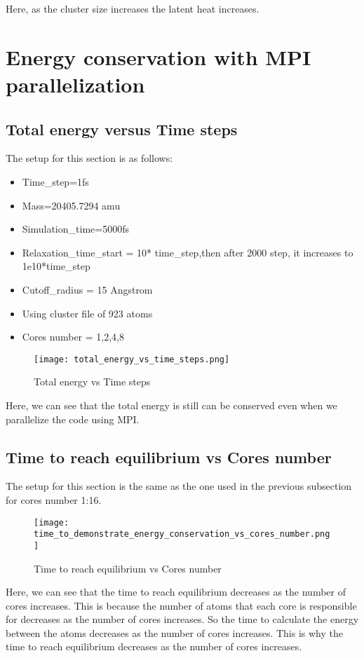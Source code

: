     Here, as the cluster size increases the latent heat increases.

\section{Energy conservation with MPI parallelization}
    \subsection{Total energy versus Time steps}
    The setup for this section is as follows:
    \begin{itemize}
        \item Time\_step=1fs
        \item Mass=20405.7294 amu
        \item Simulation\_time=5000fs
        \item Relaxation\_time\_start = 10* time\_step,then after 2000 step, it increases to 1e10*time\_step
        \item Cutoff\_radius = 15 Angstrom
        \item Using cluster file of 923 atoms
        \item Cores number = 1,2,4,8
    \end{itemize}
    \graphicspath{ {./figures/milestone08/} }
        \begin{figure}[!htb]
        \centering
            \texttt{[image: total\_energy\_vs\_time\_steps.png]}
            \caption{Total energy vs Time steps}
        \end{figure}

        Here, we can see that the total energy is still can be conserved even when we parallelize the code using MPI.

    \subsection{Time to reach equilibrium vs Cores number}
    The setup for this section is the same as the one used in the previous subsection for cores number 1:16.

    \graphicspath{ {./figures/milestone08/} }
    \begin{figure}[H]
    \centering
        \texttt{[image: time\_to\_demonstrate\_energy\_conservation\_vs\_cores\_number.png]}
        \caption{Time to reach equilibrium vs Cores number}
    \end{figure}  

    Here, we can see that the time to reach equilibrium decreases as the number of cores increases. This is because the number of atoms that each core is responsible for decreases as the number of cores increases. So the time to calculate the energy between the atoms decreases as the number of cores increases. This is why the time to reach equilibrium decreases as the number of cores increases.

